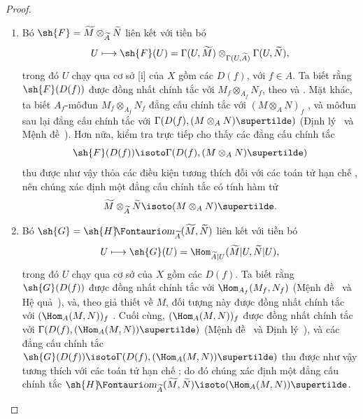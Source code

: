 \documentclass[oneside]{amsart}
\makeatletter
\newcommand{\ega@arrow}[2]{\mathchoice{#1}{#2}{#2}{#2}}
\let\ega@shortmapsto\mapsto
\renewcommand{\mapsto}{\ega@arrow{\longmapsto}{\ega@shortmapsto}}
\newcommand*{\ega@sheafop}[3]{\sh{#1}#2\textup{\kern-2.2pt{\Fontauri\slshape #3}}}
\newcommand*{\shHom}{\ega@sheafop{H}{}{om}}
\newcommand{\oldpage}[2][]{{\marginnote{\normalfont\textbf{#1}~|~#2}}\ignorespaces}
\makeatother
\begin{document}
\begin{proof}
\medskip\noindent
\begin{enumerate}
  \item[(i)] Bó $\sh{F}=\widetilde{M}\otimes_{\widetilde{A}}\widetilde{N}$ liên kết với tiền bó
    \[
      U\mapsto\sh{F}(U)=\Gamma(U,\widetilde{M})\otimes_{\Gamma(U,\widetilde{A})}\Gamma(U,\widetilde{N}),
    \]
    trong đó $U$ chạy qua cơ sở [i] của $X$ gồm các $D(f)$, với $f\in A$.
    Ta biết rằng $\sh{F}(D(f))$ được đồng nhất chính tắc với $M_f\otimes_{A_f}N_f$, theo  và .
    Mặt khác, ta biết $A_f$-môđun $M_f\otimes_{A_f}N_f$ đẳng cấu chính tắc với $(M\otimes_A N)_f$ , và môđun sau lại đẳng cấu chính tắc với $\Gamma(D(f),(M\otimes_A N)\supertilde)$ (Định lý~ và Mệnh đề~).
    Hơn nữa, kiểm tra trực tiếp cho thấy các đẳng cấu chính tắc
    \[
      \sh{F}(D(f))\isoto\Gamma(D(f),(M\otimes_A N)\supertilde)
    \]
\oldpage[I]{89}
    thu được như vậy thỏa các điều kiện tương thích đối với các toán tử hạn chế , nên chúng xác định một đẳng cấu chính tắc có tính hàm tử
    \[
      \widetilde{M}\otimes_{\widetilde{A}}\widetilde{N}\isoto(M\otimes_A N)\supertilde.
    \]
  \item[(ii)] Bó $\sh{G}=\shHom_{\widetilde{A}}(\widetilde{M},\widetilde{N})$ liên kết với tiền bó
    \[
      U\mapsto\sh{G}(U)=\Hom_{\widetilde{A}|U}(\widetilde{M}|U,\widetilde{N}|U),
    \]
    trong đó $U$ chạy qua cơ sở của $X$ gồm các $D(f)$.
    Ta biết rằng $\sh{G}(D(f))$ được đồng nhất chính tắc với $\Hom_{A_f}(M_f,N_f)$ (Mệnh đề~ và
    Hệ quả~), và, theo giả thiết về $M$, đối tượng này được đồng nhất chính tắc với $(\Hom_A(M,N))_f$ .
    Cuối cùng, $(\Hom_A(M,N))_f$ được đồng nhất chính tắc với $\Gamma(D(f),(\Hom_A(M,N))\supertilde)$ (Mệnh đề~ và Định lý~), và các đẳng cấu chính tắc $\sh{G}(D(f))\isoto\Gamma(D(f),(\Hom_A(M,N))\supertilde)$ thu được như vậy tương thích với các toán tử hạn chế ;
    do đó chúng xác định một đẳng cấu chính tắc $\shHom_{\widetilde{A}}(\widetilde{M},\widetilde{N})\isoto(\Hom_A(M,N))\supertilde$.
\end{enumerate}
\end{proof}
\end{document}
